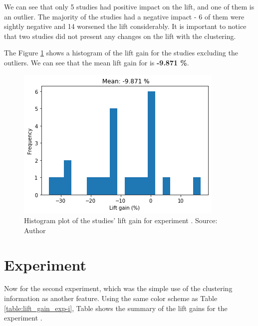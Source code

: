 We can see that only 5 studies had positive impact on the lift, and one of them is an outlier. The majority of the studies had a negative impact - 6 of them were sightly negative and 14 worsened the lift considerably. It is important to notice that two studies did not present any changes on the lift with the clustering.

The Figure \ref{fig:lift-hist-plot-exp-i} shows a histogram of the lift gain for the studies excluding the outliers. We can see that the mean lift gain for \nameExperimentI{} is \textbf{-9.871 \%}.

\begin{figure}[h]
   \centering
   \includegraphics[width=\linewidth]{fig/ch4-lift-hist-plot-exp-i.png}
   \caption{Histogram plot of the studies' lift gain for experiment \nameExperimentI{}. Source: Author}
   \label{fig:lift-hist-plot-exp-i}
\end{figure}

\section{Experiment \nameExperimentII{}}

Now for the second experiment, which was the simple use of the clustering information as another feature. Using the same color scheme as Table \ref{table:lift_gain_exp-i}, Table \label{table:lift_gain_exp-ii} shows the summary of the lift gains for the experiment \nameExperimentII{}.

